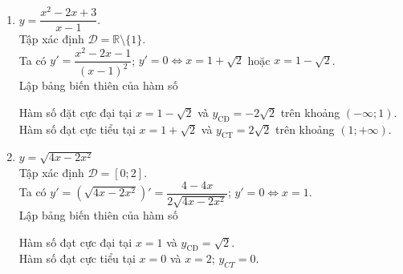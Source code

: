 \begin{bt}
{\begin{enumerate}
\begin{center}
\begin{tikzpicture}
				\end{tikzpicture}
			\end{center}
			Hàm số đạt cực tiểu tại $x=-\sqrt{2}$ và $x=\sqrt{2}$, $y_{CT}=-2$.\\
			Hàm số đạt cực đại tại $x=0$ và $y_{\text{CĐ}}=2$.
			\item $y=\dfrac{x^2-2x+3}{x-1}$.\\
			Tập xác định $\mathscr{D}=\mathbb{R}\setminus\{1\}$.\\
			Ta có $y'=\dfrac{x^2-2x-1}{(x-1)^2}$; $y'=0\Leftrightarrow x=1+\sqrt{2}$ hoặc $x=1-\sqrt{2}$.\\
			Lập bảng biến thiên của hàm số 
			\begin{center}
			\end{center}
			Hàm số đặt cực đại tại $x=1-\sqrt{2}$ và $y_{\text{CĐ}}=-2\sqrt{2}$ trên khoảng $(-\infty;1)$.\\
			Hàm số đạt cực tiểu tại $x=1+\sqrt{2}$ và $y_{\text{CT}}=2\sqrt{2}$ trên khoảng $(1;+\infty)$.
			\item $y=\sqrt{4x-2x^2}$\\
			Tập xác định $\mathscr{D}=[0;2]$.\\
			Ta có $y'=\left(\sqrt{4x-2x^2}\right)'=\dfrac{4-4x}{2\sqrt{4x-2x^2}}$; $y'=0\Leftrightarrow x=1$.\\
			Lập bảng biến thiên của hàm số
			\begin{center}
			\end{center}
			Hàm số đạt cực đại tại $x=1$ và $y_{\text{CĐ}}=\sqrt{2}$.\\
			Hàm số đạt cực tiểu tại $x=0$ và $x=2$; $y_{CT}=0$.
		\end{enumerate}
	}
\end{bt}

